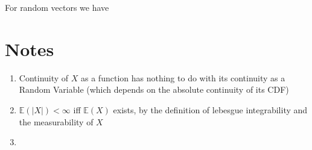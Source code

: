 \documentclass[a4paper,portrait,columns=2]{cheatsheet}
\begin{document}
For random vectors we have

\section{Notes}
\begin{enumerate}
	\item Continuity of \(X\) as a function has nothing to do with its continuity as a Random Variable (which depends on the absolute continuity of its CDF) \cite{976739}

	\item \(\mathbb{E}(|X|)<\infty\) iff \(\mathbb{E}(X)\) exists, by the definition of lebesgue integrability and the measurability of \(X\)
	
	\item 
	
\end{enumerate}

\newpage



\end{document}
